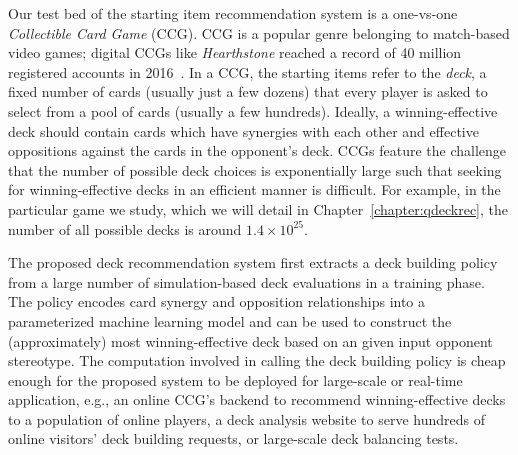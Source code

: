 Our test bed of the starting item recommendation system is a one-vs-one \textit{Collectible Card Game} (CCG). CCG is a popular genre belonging to match-based video games; digital CCGs like \textit{Hearthstone} reached a record of 40 million registered accounts in 2016~\cite{hearthstonepopular}. In a CCG, the starting items refer to the \textit{deck}, a fixed number of cards (usually just a few dozens) that every player is asked to select from a pool of cards (usually a few hundreds). Ideally, a winning-effective deck should contain cards which have synergies with each other and effective oppositions against the cards in the opponent's deck. CCGs feature the challenge that the number of possible deck choices is exponentially large such that seeking for winning-effective decks in an efficient manner is difficult. For example, in the particular game we study, which we will detail in Chapter~\ref{chapter:qdeckrec}, the number of all possible decks is around $1.4 \times 10^{25}$. 

The proposed deck recommendation system first extracts a deck building policy from a large number of simulation-based deck evaluations in a training phase. The policy encodes card synergy and opposition relationships into a parameterized machine learning model and can be used to construct the (approximately) most winning-effective deck based on an given input opponent stereotype. The computation involved in calling the deck building policy is cheap enough for the proposed system to be deployed for large-scale or real-time application, e.g., an online CCG's backend to recommend winning-effective decks to a population of online players, a deck analysis website to serve hundreds of online visitors' deck building requests, or large-scale deck balancing tests. 


